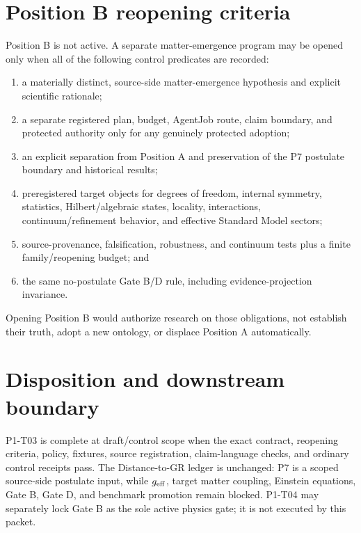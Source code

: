 \documentclass[11pt]{article}
\begin{document}
\section{Position B reopening criteria}

Position B is not active. A separate matter-emergence program may be opened
only when all of the following control predicates are recorded:
\begin{enumerate}
  \item a materially distinct, source-side matter-emergence hypothesis and
        explicit scientific rationale;
  \item a separate registered plan, budget, AgentJob route, claim boundary,
        and protected authority only for any genuinely protected adoption;
  \item an explicit separation from Position A and preservation of the P7
        postulate boundary and historical results;
  \item preregistered target objects for degrees of freedom, internal symmetry,
        statistics, Hilbert/algebraic states, locality, interactions,
        continuum/refinement behavior, and effective Standard Model sectors;
  \item source-provenance, falsification, robustness, and continuum tests plus
        a finite family/reopening budget; and
  \item the same no-postulate Gate B/D rule, including evidence-projection
        invariance.
\end{enumerate}
Opening Position B would authorize research on those obligations, not establish
their truth, adopt a new ontology, or displace Position A automatically.

\section{Disposition and downstream boundary}

P1-T03 is complete at draft/control scope when the exact contract, reopening
criteria, policy, fixtures, source registration, claim-language checks, and
ordinary control receipts pass. The Distance-to-GR ledger is unchanged: P7 is
a scoped source-side postulate input, while $g_{\rm eff}$, target matter
coupling, Einstein equations, Gate B, Gate D, and benchmark promotion remain
blocked. P1-T04 may separately lock Gate B as the sole active physics gate; it
is not executed by this packet.
\end{document}

